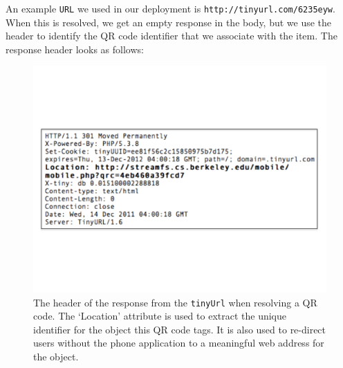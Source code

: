An example {\tt URL} we used in our deployment is {\tt http://tinyurl.com/6235eyw}.
When this is resolved, we get an empty response in the body, but we use the header to identify the QR code identifier 
that we associate with the item.  The response header looks as follows:
\begin{figure}[htb!]
\begin{center}
\includegraphics[scale=0.30]{figs/tinyurlhdr}
\caption{The header of the response from the {\tt tinyUrl} when resolving a QR code.  The `Location' attribute
is used to extract the unique identifier for the object this QR code tags.  It is also used to re-direct
users without the phone application to a meaningful web address for the object.}
\label{fig:tinyurlhdr}
\end{center}
\end{figure}


